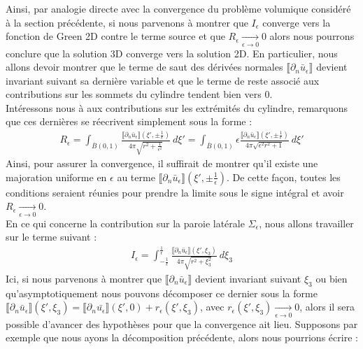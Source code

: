 Ainsi, par analogie directe avec la convergence du problème volumique considéré à la section précédente, si nous parvenons à montrer que $I_{\epsilon}$ converge vers la fonction de Green 2D contre le terme source et que $R_{\epsilon} \xrightarrow[\epsilon \to 0]{} 0$ alors nous pourrons conclure que la solution 3D converge vers la solution 2D. En particulier, nous allons devoir montrer que le terme de saut des dérivées normales $\llbracket \partial_n \bar{u}_{\epsilon} \rrbracket$ devient invariant
suivant sa dernière variable et que le terme de reste associé aux contributions sur les sommets du cylindre tendent bien vers 0. \\
Intéressons nous à aux contributions sur les extrémités du cylindre, remarquons que ces dernières se réecrivent simplement sous la forme :
\begin{align*}
    R_{\epsilon} = \int_{\overline{B}(0,1)} \frac{\llbracket \partial_n \bar{u}_{\epsilon} \rrbracket (\xi',\pm \frac{1}{\epsilon})}{4\pi \sqrt{r^2 + \frac{1}{\epsilon^2}}} \ d\xi' = \int_{\overline{B}(0,1)} \epsilon \frac{\llbracket \partial_n \bar{u}_{\epsilon} \rrbracket (\xi',\pm \frac{1}{\epsilon})}{4\pi \sqrt{\epsilon^2r^2 + 1}} \ d\xi'
\end{align*}
Ainsi, pour assurer la convergence, il suffirait de montrer qu'il existe une majoration uniforme en $\epsilon$ au terme $\llbracket \partial_n\bar{u}_{\epsilon} \rrbracket (\xi',\pm \frac{1}{\epsilon})$. De cette façon, toutes les conditions seraient réunies pour prendre la limite sous le signe intégral et avoir $R_{\epsilon} \xrightarrow[\epsilon \to 0]{} 0$. \\
En ce qui concerne la contribution sur la paroie latérale $\Sigma_{\epsilon}$, nous allons travailler sur le terme suivant :
\begin{align*}
    I_{\epsilon} = \int_{-\frac{1}{\epsilon}}^{\frac{1}{\epsilon}} \frac{\llbracket \partial_n \bar{u}_{\epsilon}\rrbracket (\xi',\xi_3)}{4\pi \sqrt{r^2 + \xi_3^2}} \ d\xi_3
\end{align*}
Ici, si nous parvenons à montrer que $\llbracket \partial_n \bar{u}_{\epsilon} \rrbracket$ devient invariant suivant $\xi_3$ ou bien qu'asymptotiquement nous pouvons décomposer ce dernier sous la forme $\llbracket \partial_n \bar{u}_{\epsilon} \rrbracket(\xi',\xi_3) = \llbracket \partial_n \bar{u_{\epsilon}} \rrbracket(\xi',0) + r_{\epsilon}(\xi',\xi_3)$, avec $r_{\epsilon}(\xi',\xi_3) \xrightarrow[\epsilon \to 0]{} 0$, alors il sera possible d'avancer des hypothèses pour que la convergence ait lieu.
Supposons par exemple que nous ayons la décomposition précédente, alors nous pourrions écrire :
